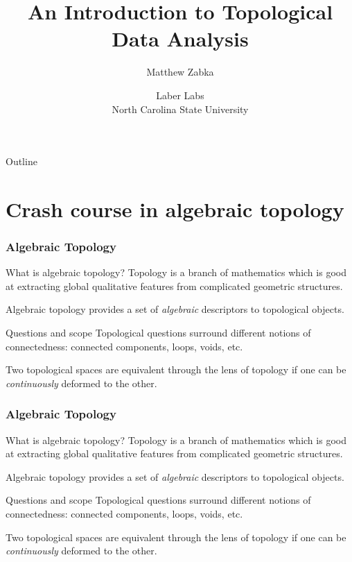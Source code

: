 \documentclass[usenames,dvipsnames,aspectratio=1610]{beamer}
\title{An Introduction to Topological Data Analysis}
\author{Matthew Zabka}
\date{Laber Labs \\ North Carolina State University}
\institute{Southwest Minnesota State University}
\begin{document}
\begin{frame}[plain]
  \maketitle
\end{frame}


\begin{frame}{Outline}
  \tableofcontents
\end{frame}


\section{Crash course in algebraic topology}
\begin{frame}
  \frametitle{Algebraic Topology}
  \begin{block}{What is algebraic topology?}
    Topology is a branch of mathematics which is good at extracting global
    qualitative features from complicated geometric structures. 
    
    Algebraic topology provides a set of {\em algebraic} descriptors to topological objects.
  \end{block}
  \pause

  \begin{block}{Questions and scope}
    Topological questions surround different notions of connectedness:
    connected components, loops, voids, etc.

    Two topological spaces are equivalent through the lens of topology if one
    can be {\em continuously} deformed to the other. 
  \end{block}
\end{frame}

\begin{frame}
  \frametitle{Algebraic Topology}
  \begin{block}{What is algebraic topology?}
    Topology is a branch of mathematics which is good at extracting global
    qualitative features from complicated geometric structures. 
    
    Algebraic topology provides a set of {\em algebraic} descriptors to topological objects.
  \end{block}

  \begin{block}{Questions and scope}
    Topological questions surround different notions of connectedness:
    connected components, loops, voids, etc.

    Two topological spaces are equivalent through the lens of topology if one
    can be {\em continuously} deformed to the other. 
  \end{block}
\end{frame}
\end{document}
